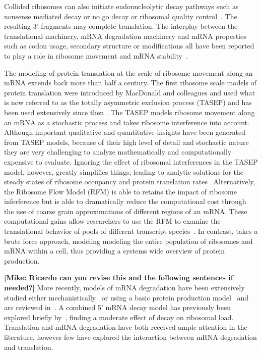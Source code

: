 \documentclass[10pt,letterpaper]{article}
\begin{document}
Collided ribosomes can also initiate endonucleolytic decay pathways such as nonsense mediated decay or no go decay or ribosomal quality control~\cite{RN6,RN7}.
The resulting 3' fragments may complete translation.
The interplay between the translational machinery, mRNA degradation machinery and mRNA properties such as codon usage, secondary structure or modifications all have been reported to play a role in ribosome movement and mRNA stability~\cite{RN8, RN9, RN10}.


The modeling of protein translation at the scale of ribosome movement along an mRNA extends back more than half a century.
The first ribosome scale models of protein translation were introduced by MacDonald and colleagues \cite{MacDonaldEtAl1968,MacDonaldAndGibbs1969,vonHeijneEtAl1987} and used what is now referred to as the totally asymmetric exclusion process (TASEP) and has been used extensively since then \cite[e.g.]{RN13,RN14}.
The TASEP models ribosome movement along an mRNA as a stochastic process and takes ribosome interference into account.
Although important qualitative and quantitative insights have been generated \cite{vonHeijneEtAl1987,Chou2003,RN14} from TASEP models, because of their high level of detail and stochastic nature they are very challenging to analyze mathematically and computationally expensive to evaluate. 
Ignoring the effect of ribosomal interferences in the TASEP model, however, greatly simplifies things; leading to analytic solutions for the steady states of ribosome occupancy and protein translation rates~\cite[e.g.]{GilchristAndWagner2006,ShahAndGilchrist2011}
Alternatively, the Ribosome Flow Model (RFM) \cite{RN15} is able to retains the impact of ribosome inferference but is able to dramatically reduce the computational cost through the use of coarse grain approximations of different regions of an mRNA.
These computational gains allow researchers to use the RFM to examine the translational behavior of pools of different transcript species~\cite{RN16}.
In contrast, \cite{RN17} takes a brute force approach, modeling modeling the entire population of ribosomes and mRNA within a cell, thus providing a systems wide overview of protein production.

\textbf{[Mike: Ricardo can you revise this and the following sentences if needed?]}
More recently, models of mRNA degradation have been extensively studied  either mechanistically~\cite{RN18,RN19} or using a basic protein production model~\cite{RN20} and are reviewed in~\cite{RN21,RN22}.
A combined 5' mRNA decay model has previously been explored briefly by~\cite{RN22}, finding a moderate effect of decay on ribosomal load.
Translation and mRNA degradation have both received ample attention in the literature, however few have explored the interaction between mRNA degradation and translation.
\end{document}
